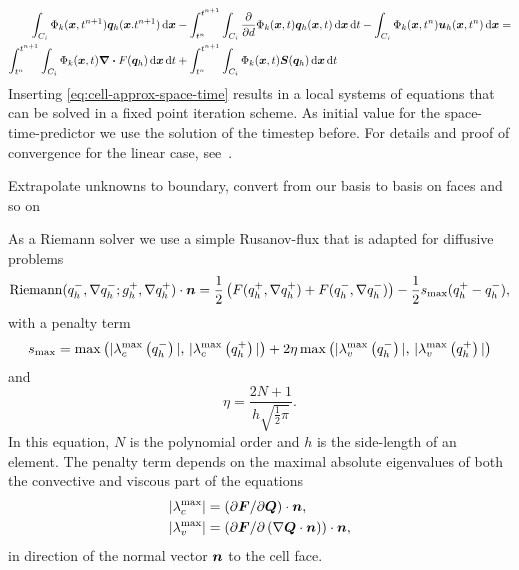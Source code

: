 \begin{align}\label{eq:space-time-predictor}
\begin{split}
\intdcell{
  \testfunction{k} (\bm{x}, t^{n+1}) \stpredictor(\bm{x}. t^{n+1})
}
&-
\intdt{\intdcell{
    \pdv{}{d} \testfunction{k}(\bm{x}, t) \stpredictor(\bm{x}, t)
}}
-
\intdcell{
  \testfunction{k}(\bm{x},t^n) \dsol(\bm{x}, t^n)
} = \\
\intdt{\intdcell{
    \testfunction{k}(\bm{x},t) \divergence{\flux(\stpredictor)}
}}
&+
\intdt{\intdcell{
    \testfunction{k}(\bm{x}, t) \source(\stpredictor)
}}
\end{split}
\end{align}
Inserting \cref{eq:cell-approx-space-time} results in a local systems of equations that can be solved in a fixed point iteration scheme.
As initial value for the space-time-predictor we use the solution of the timestep before.
For details and proof of convergence for the linear case, see~\cite{dumbser2008unified}.

Extrapolate unknowns to boundary, convert from our basis to basis on faces and so on

As a Riemann solver we use a simple Rusanov-flux that is adapted for diffusive problems
\begin{equation}
  \label{eq:rusanov-flux}
  \operatorname{Riemann}(q_h^-, \nabla q_h^-; g_h^+, \nabla q_h^+) \cdot \bm{n} =
  \frac{1}{2} \left(
    F(q_h^+, \nabla q_h^+) +
    F(q_h^-, \nabla q_h^-)
  \right) -
  \frac{1}{2} s_\text{max} (q_h^+ - q_h^-),
\end{equation}
with a penalty term
\begin{equation}
  \label{eq:parabolic-penalty}
  s_\text{max}  = \max \left(
\maxConvEigen[q_h^-], \, \maxConvEigen[q_h^+]
\right) +
2 \eta \max \left(
\maxViscEigen[q_h^-], \, \maxViscEigen[q_h^+]
\right)
\end{equation}
and
\begin{equation}
  \eta = \frac{2N+1}{h \sqrt{\frac{1}{2} \pi}}.
\end{equation}
In this equation, $N$ is the polynomial order and $h$ is the side-length of an element.
The penalty term depends on the maximal absolute eigenvalues of both the convective and viscous part of the equations
\begin{align}
  \begin{split}
    \maxConvEigen &= \left( \partial \bm{F}/\partial \bm{Q}\right) \cdot \normal,\\
    \maxViscEigen &= \left( \partial \bm{F}/\partial \left( \nabla \bm{Q} \cdot \normal \right)\right) \cdot \normal,
  \end{split}
\end{align}
in direction of the normal vector $\bm{n}$ to the cell face. 

